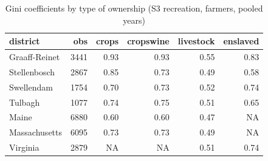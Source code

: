 \begin{table}

\caption{Gini coefficients by type of ownership (S3 recreation, farmers, pooled years)}
\centering
\begin{tabular}[t]{lrrrrr}
\toprule
district & obs & crops & cropswine & livestock & enslaved\\
\midrule
Graaff-Reinet & 3441 & 0.93 & 0.93 & 0.55 & 0.83\\
Stellenbosch & 2867 & 0.85 & 0.73 & 0.49 & 0.58\\
Swellendam & 1754 & 0.70 & 0.73 & 0.52 & 0.74\\
Tulbagh & 1077 & 0.74 & 0.75 & 0.51 & 0.65\\
Maine & 6880 & 0.60 & 0.60 & 0.47 & NA\\
\addlinespace
Massachusetts & 6095 & 0.73 & 0.73 & 0.49 & NA\\
Virginia & 2879 & NA & NA & 0.51 & 0.74\\
\bottomrule
\end{tabular}
\end{table}
